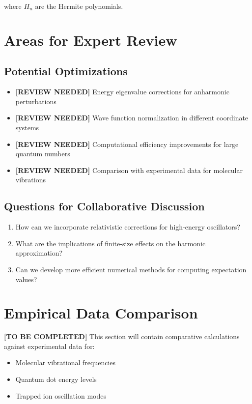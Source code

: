 \documentclass{article}
\begin{document}
where $H_n$ are the Hermite polynomials.

\section{Areas for Expert Review}

\subsection{Potential Optimizations}
\begin{itemize}
\item \textbf{[REVIEW NEEDED]} Energy eigenvalue corrections for anharmonic perturbations
\item \textbf{[REVIEW NEEDED]} Wave function normalization in different coordinate systems
\item \textbf{[REVIEW NEEDED]} Computational efficiency improvements for large quantum numbers
\item \textbf{[REVIEW NEEDED]} Comparison with experimental data for molecular vibrations
\end{itemize}

\subsection{Questions for Collaborative Discussion}
\begin{enumerate}
\item How can we incorporate relativistic corrections for high-energy oscillators?
\item What are the implications of finite-size effects on the harmonic approximation?
\item Can we develop more efficient numerical methods for computing expectation values?
\end{enumerate}

\section{Empirical Data Comparison}
\textbf{[TO BE COMPLETED]} This section will contain comparative calculations against experimental data for:
\begin{itemize}
\item Molecular vibrational frequencies
\item Quantum dot energy levels
\item Trapped ion oscillation modes
\end{itemize}
\end{document}
